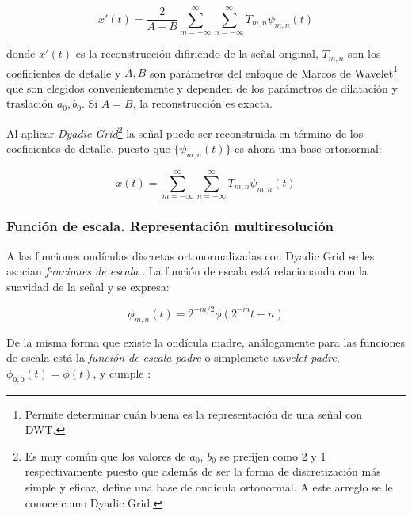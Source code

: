    \begin{equation}\label{E:discrete_reconstrution}
   	x'(t) = \dfrac{2}{A + B}
   	\sum_{m=-\infty}^{\infty} 
   	\sum_{n=-\infty}^{\infty}
   	T_{m,n} \psi_{m,n}(t)
   \end{equation}
   
   donde $x'(t)$ es la reconstrucci\'on difiriendo de la se\~nal original, $T_{m,n} $  son los coeficientes de detalle y $A, B$ son par\'ametros del enfoque de Marcos de Wavelet\footnote{Permite determinar cu\'an buena es la representaci\'on de una se\~nal con DWT.} \cite{addison2017illustrated} \cite{debnath2002wavelet} que son elegidos convenientemente y dependen de los par\'ametros de dilataci\'on y traslaci\'on $a_0,b_0$. Si $A = B$, la reconstrucci\'on es exacta.
   
   
   
   Al aplicar \emph{Dyadic Grid}\footnote{Es muy com\'un que los valores de $a_0$, $b_0$ se prefijen como 2 y 1 respectivamente puesto que adem\'as de ser la forma de discretizaci\'on m\'as simple y eficaz, define una base de ond\'icula ortonormal. A este arreglo se le conoce como Dyadic Grid.} \cite{addison2017illustrated} la se\~nal puede ser reconstruida en t\'ermino de los coeficientes de detalle, puesto que $\{ \psi_{m,n}(t) \}$ es ahora una base ortonormal:
    
     \begin{equation}\label{E:discrete_reconstrution_dg}
      	x(t) = \sum_{m=-\infty}^{\infty} 
      	\sum_{n=-\infty}^{\infty}
      	T_{m,n} \psi_{m,n}(t)
      \end{equation}
      
      
\subsubsection{Funci\'on de escala. Representaci\'on multiresoluci\'on}
A las funciones ond\'iculas discretas ortonormalizadas con Dyadic Grid se les asocian \emph{funciones de escala} \cite[secci\'on 3.2.3]{addison2017illustrated} \cite{sundararajan2016discrete} \cite{debnath2002wavelet}. La funci\'on de escala est\'a relacionanda con la suavidad de la se\~nal y se expresa:

  \begin{equation}\label{E:scaling_function}
  	\phi_{m,n}(t) = 2^{-m/2}\phi(2^{-m}t - n)
  \end{equation}
  
  
  De la misma forma que existe la ond\'icula madre, an\'alogamente para las funciones de escala est\'a la \emph{funci\'on de escala padre} o  simplemete \emph{wavelet padre},  $\phi_{0,0}(t) = \phi(t)$, y cumple \cite{addison2017illustrated} \cite[p.377]{debnath2002wavelet}:
  

